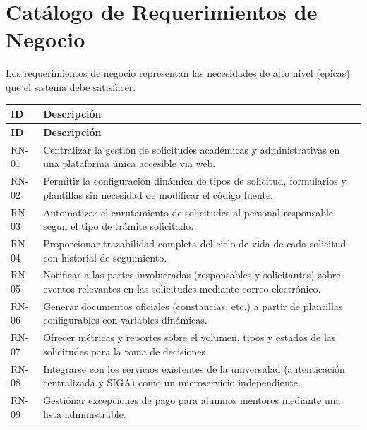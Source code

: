 \section{Catálogo de Requerimientos de Negocio}

Los requerimientos de negocio representan las necesidades de alto nivel (epicas) que el sistema debe satisfacer.

\begin{longtable}{|C{1.2cm}|L{12.5cm}|}
    \hline
    \textbf{ID} & \textbf{Descripción} \\
    \hline
    \endfirsthead
    \hline
    \textbf{ID} & \textbf{Descripción} \\
    \hline
    \endhead
    \hline
    \endfoot

    RN-01 & Centralizar la gestión de solicitudes académicas y administrativas en una plataforma única accesible via web. \\
    \hline
    RN-02 & Permitir la configuración dinámica de tipos de solicitud, formularios y plantillas sin necesidad de modificar el código fuente. \\
    \hline
    RN-03 & Automatizar el enrutamiento de solicitudes al personal responsable segun el tipo de trámite solicitado. \\
    \hline
    RN-04 & Proporcionar trazabilidad completa del ciclo de vida de cada solicitud con historial de seguimiento. \\
    \hline
    RN-05 & Notificar a las partes involucradas (responsables y solicitantes) sobre eventos relevantes en las solicitudes mediante correo electrónico. \\
    \hline
    RN-06 & Generar documentos oficiales (constancias, etc.) a partir de plantillas configurables con variables dinámicas. \\
    \hline
    RN-07 & Ofrecer métricas y reportes sobre el volumen, tipos y estados de las solicitudes para la toma de decisiones. \\
    \hline
    RN-08 & Integrarse con los servicios existentes de la universidad (autenticación centralizada y SIGA) como un microservicio independiente. \\
    \hline
    RN-09 & Gestiónar excepciones de pago para alumnos mentores mediante una lista administrable. \\
    \hline
\end{longtable}

